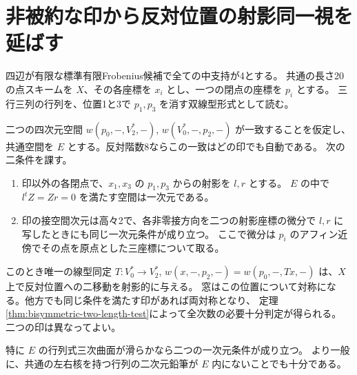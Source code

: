 \section{非被約な印から反対位置の射影同一視を延ばす}
\label{sec:finite-marked-projection-symmetry}
四辺が有限な標準有限Frobenius候補で全ての中支持が4とする。
共通の長さ20の点スキームを $X$、その各座標を $x_i$ とし、一つの閉点の座標を $p_i$ とする。
三行三列の行列を、位置1と3で $p_1,p_3$ を消す双線型形式として読む。
\begin{theorem}\label{thm:finite-marked-projection-symmetry}
二つの四次元空間 $w(p_0,-,V_2^*,-)$, $w(V_0^*,-,p_2,-)$ が一致することを仮定し、
共通空間を $E$ とする。反対階数8ならこの一致はどの印でも自動である。
次の二条件を課す。
\begin{enumerate}
\item 印以外の各閉点で、$x_1,x_3$ の $p_1,p_3$ からの射影を $l,r$ とする。
$E$ の中で $l^tZ=Zr=0$ を満たす空間は一次元である。
\item 印の接空間次元は高々2で、各非零接方向を二つの射影座標の微分で
$l,r$ に写したときにも同じ一次元条件が成り立つ。
ここで微分は $p_i$ のアフィン近傍でその点を原点とした三座標について取る。
\end{enumerate}
このとき唯一の線型同定 $T:V_0^*\to V_2^*$,
$w(x,-,p_2,-)=w(p_0,-,Tx,-)$ は、$X$ 上で反対位置への二移動を射影的に与える。
窓はこの位置について対称になる。他方でも同じ条件を満たす印があれば両対称となり、
定理\ref{thm:bisymmetric-two-length-test}によって全次数の必要十分判定が得られる。
二つの印は異なってよい。

特に $E$ の行列式三次曲面が滑らかなら二つの一次元条件が成り立つ。
より一般に、共通の左右核を持つ行列の二次元鉛筆が $E$ 内にないことでも十分である。
\end{theorem}
